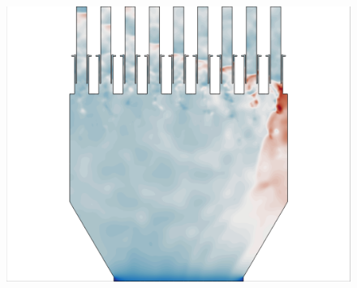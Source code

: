 \begin{figure}
{\begin{minipage}{0.32\linewidth}
		\includegraphics[width=0.99\linewidth,trim={0.5em 0.5em 15.0em 0.5em},clip]{Chapters/HPROMResults/Images/nineElem/unsampled/rom_k75_pressure_z.png}
	\end{minipage}
	}


\end{figure}
